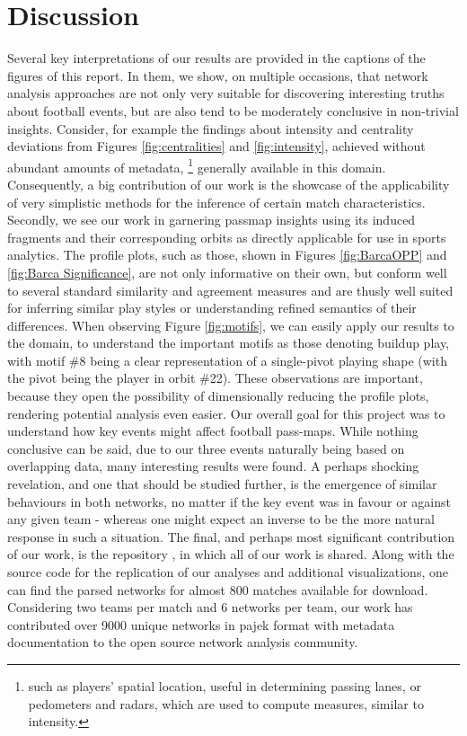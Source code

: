 \documentclass[9pt,twocolumn,twoside]{pnas-report}
\begin{document}
\section*{Discussion}
Several key interpretations of our results are provided in the captions of the figures of this report. In them, we show, on multiple occasions, that network analysis approaches are not only very suitable for discovering interesting truths about football events, but are also tend to be moderately conclusive in non-trivial insights. Consider, for example the findings about intensity and centrality deviations from Figures \ref{fig:centralities} and \ref{fig:intensity}, achieved without abundant amounts of metadata, \footnote{such as players' spatial location, useful in determining passing lanes, or pedometers and radars, which are used to compute measures, similar to intensity.} generally available in this domain. Consequently, a big contribution of our work is the showcase of the applicability of very simplistic methods for the inference of certain match characteristics.
Secondly, we see our work in garnering passmap insights using its induced fragments and their corresponding orbits as directly applicable for use in sports analytics. The profile plots, such as those, shown in Figures \ref{fig:BarcaOPP} and \ref{fig:Barca Significance}, are not only informative on their own, but conform well to several standard similarity and agreement measures and are thusly well suited for inferring similar play styles or understanding refined semantics of their differences. When observing Figure \ref{fig:motifs}, we can easily apply our results to the domain, to understand the important motifs as those denoting buildup play, with motif \#8 being a clear representation of a single-pivot playing shape (with the pivot being the player in orbit \#22). These observations are important, because they open the possibility of dimensionally reducing the profile plots, rendering potential analysis even easier.
Our overall goal for this project was to understand how key events might affect football pass-maps. While nothing conclusive can be said, due to our three events naturally being based on overlapping data, many interesting results were found. A perhaps shocking revelation, and one that should be studied further, is the emergence of similar behaviours in both networks, no matter if the key event was in favour or against any given team - whereas one might expect an inverse to be the more natural response in such a situation. 
The final, and perhaps most significant contribution of our work, is the repository \cite{marusagit}, in which all of our work is shared. Along with the source code for the replication of our analyses and additional visualizations, one can find the parsed networks for almost 800 matches available for download. Considering two teams per match and 6 networks per team, our work has contributed over 9000 unique networks in pajek format with metadata documentation to the open source network analysis community.
\end{document}
